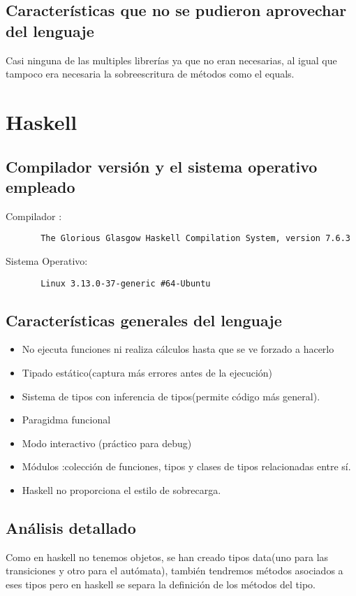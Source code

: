 \documentclass[12pt,a4paper]{article}
\begin{document}
    \subsection{Características que no se pudieron aprovechar del lenguaje}
    Casi ninguna de las multiples librerías ya que no eran necesarias, al igual que tampoco era necesaria la sobreescritura de métodos como el equals.
     \section{Haskell}
       \subsection{Compilador versión y el sistema operativo empleado}
       Compilador :
       \begin{lstlisting}
       The Glorious Glasgow Haskell Compilation System, version 7.6.3
       \end{lstlisting}
       Sistema Operativo:
       \begin{lstlisting}
       Linux 3.13.0-37-generic #64-Ubuntu
       \end{lstlisting}
       \subsection{Características generales del lenguaje}
        \begin{itemize}
       	\item No ejecuta funciones ni realiza cálculos hasta que se ve forzado a hacerlo
        \item Tipado estático(captura más errores antes de la ejecución)
        \item Sistema de tipos con inferencia de tipos(permite código más general).
        \item Paragidma funcional
        \item Modo interactivo (práctico para debug)
        \item Módulos :colección de funciones, tipos y clases de tipos relacionadas entre sí.
        \item Haskell no proporciona el estilo de sobrecarga.
       \end{itemize}
       \subsection{Análisis detallado}
        Como en haskell no tenemos objetos, se han creado tipos data(uno para las transiciones y otro para el autómata), también tendremos métodos asociados a eses tipos pero en haskell se separa la definición de los métodos del tipo.
        
\end{document}
